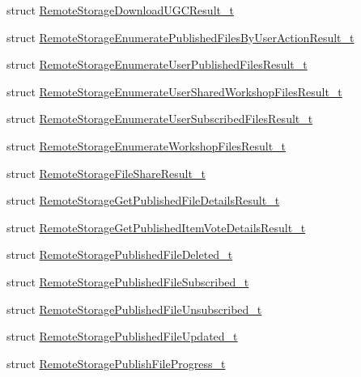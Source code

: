 \begin{DoxyCompactItemize}
struct \hyperlink{structValve_1_1Steamworks_1_1RemoteStorageDownloadUGCResult__t}{Remote\+Storage\+Download\+U\+G\+C\+Result\+\_\+t}
\item 
struct \hyperlink{structValve_1_1Steamworks_1_1RemoteStorageEnumeratePublishedFilesByUserActionResult__t}{Remote\+Storage\+Enumerate\+Published\+Files\+By\+User\+Action\+Result\+\_\+t}
\item 
struct \hyperlink{structValve_1_1Steamworks_1_1RemoteStorageEnumerateUserPublishedFilesResult__t}{Remote\+Storage\+Enumerate\+User\+Published\+Files\+Result\+\_\+t}
\item 
struct \hyperlink{structValve_1_1Steamworks_1_1RemoteStorageEnumerateUserSharedWorkshopFilesResult__t}{Remote\+Storage\+Enumerate\+User\+Shared\+Workshop\+Files\+Result\+\_\+t}
\item 
struct \hyperlink{structValve_1_1Steamworks_1_1RemoteStorageEnumerateUserSubscribedFilesResult__t}{Remote\+Storage\+Enumerate\+User\+Subscribed\+Files\+Result\+\_\+t}
\item 
struct \hyperlink{structValve_1_1Steamworks_1_1RemoteStorageEnumerateWorkshopFilesResult__t}{Remote\+Storage\+Enumerate\+Workshop\+Files\+Result\+\_\+t}
\item 
struct \hyperlink{structValve_1_1Steamworks_1_1RemoteStorageFileShareResult__t}{Remote\+Storage\+File\+Share\+Result\+\_\+t}
\item 
struct \hyperlink{structValve_1_1Steamworks_1_1RemoteStorageGetPublishedFileDetailsResult__t}{Remote\+Storage\+Get\+Published\+File\+Details\+Result\+\_\+t}
\item 
struct \hyperlink{structValve_1_1Steamworks_1_1RemoteStorageGetPublishedItemVoteDetailsResult__t}{Remote\+Storage\+Get\+Published\+Item\+Vote\+Details\+Result\+\_\+t}
\item 
struct \hyperlink{structValve_1_1Steamworks_1_1RemoteStoragePublishedFileDeleted__t}{Remote\+Storage\+Published\+File\+Deleted\+\_\+t}
\item 
struct \hyperlink{structValve_1_1Steamworks_1_1RemoteStoragePublishedFileSubscribed__t}{Remote\+Storage\+Published\+File\+Subscribed\+\_\+t}
\item 
struct \hyperlink{structValve_1_1Steamworks_1_1RemoteStoragePublishedFileUnsubscribed__t}{Remote\+Storage\+Published\+File\+Unsubscribed\+\_\+t}
\item 
struct \hyperlink{structValve_1_1Steamworks_1_1RemoteStoragePublishedFileUpdated__t}{Remote\+Storage\+Published\+File\+Updated\+\_\+t}
\item 
struct \hyperlink{structValve_1_1Steamworks_1_1RemoteStoragePublishFileProgress__t}{Remote\+Storage\+Publish\+File\+Progress\+\_\+t}

\end{DoxyCompactItemize}
